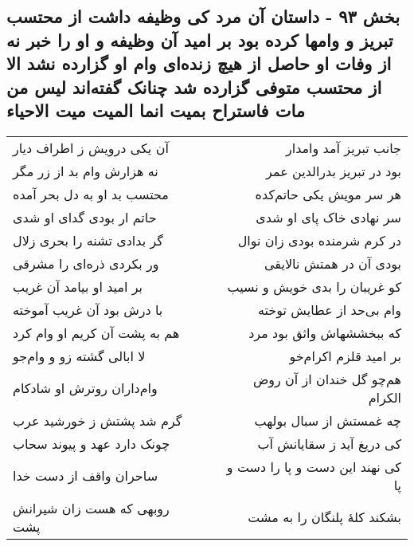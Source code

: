 \begin{center}
\section*{بخش ۹۳ - داستان آن مرد کی وظیفه داشت از محتسب تبریز و وامها کرده بود بر امید آن وظیفه و او را خبر نه از وفات او  حاصل از هیچ زنده‌ای وام او گزارده نشد الا از محتسب متوفی گزارده شد چنانک گفته‌اند لیس من مات فاستراح بمیت  انما المیت میت الاحیاء}
\label{sec:sh093}
\begin{longtable}{l p{0.5cm} r}
آن یکی درویش ز اطراف دیار
&&
جانب تبریز آمد وامدار
\\
نه هزارش وام بد از زر مگر
&&
بود در تبریز بدرالدین عمر
\\
محتسب بد او به دل بحر آمده
&&
هر سر مویش یکی حاتم‌کده
\\
حاتم ار بودی گدای او شدی
&&
سر نهادی خاک پای او شدی
\\
گر بدادی تشنه را بحری زلال
&&
در کرم شرمنده بودی زان نوال
\\
ور بکردی ذره‌ای را مشرقی
&&
بودی آن در همتش نالایقی
\\
بر امید او بیامد آن غریب
&&
کو غریبان را بدی خویش و نسیب
\\
با درش بود آن غریب آموخته
&&
وام بی‌حد از عطایش توخته
\\
هم به پشت آن کریم او وام کرد
&&
که ببخششهاش واثق بود مرد
\\
لا ابالی گشته زو و وام‌جو
&&
بر امید قلزم اکرام‌خو
\\
وام‌داران روترش او شادکام
&&
هم‌چو گل خندان از آن روض الکرام
\\
گرم شد پشتش ز خورشید عرب
&&
چه غمستش از سبال بولهب
\\
چونک دارد عهد و پیوند سحاب
&&
کی دریغ آید ز سقایانش آب
\\
ساحران واقف از دست خدا
&&
کی نهند این دست و پا را دست و پا
\\
روبهی که هست زان شیرانش پشت
&&
بشکند کلهٔ پلنگان را به مشت
\\
\end{longtable}
\end{center}
